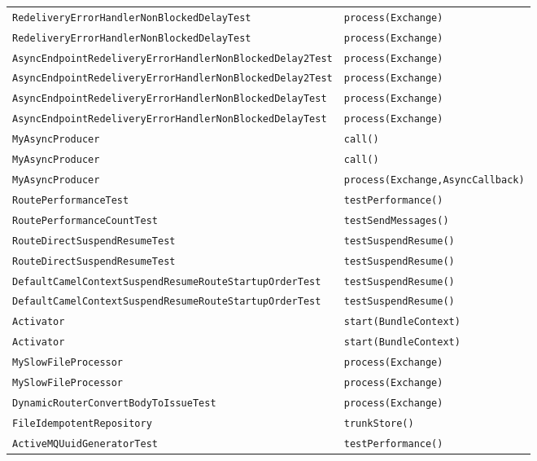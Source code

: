 \begin{center}
\begin{longtable}{ll}
\lstinline/RedeliveryErrorHandlerNonBlockedDelayTest/&{\lstinline/process(Exchange)/}\\
\lstinline/RedeliveryErrorHandlerNonBlockedDelayTest/&{\lstinline/process(Exchange)/}\\
\lstinline/AsyncEndpointRedeliveryErrorHandlerNonBlockedDelay2Test/&{\lstinline/process(Exchange)/}\\
\lstinline/AsyncEndpointRedeliveryErrorHandlerNonBlockedDelay2Test/&{\lstinline/process(Exchange)/}\\
\lstinline/AsyncEndpointRedeliveryErrorHandlerNonBlockedDelayTest/&{\lstinline/process(Exchange)/}\\
\lstinline/AsyncEndpointRedeliveryErrorHandlerNonBlockedDelayTest/&{\lstinline/process(Exchange)/}\\
\lstinline/MyAsyncProducer/&{\lstinline/call()/}\\
\lstinline/MyAsyncProducer/&{\lstinline/call()/}\\
\lstinline/MyAsyncProducer/&{\lstinline/process(Exchange,AsyncCallback)/}\\
\lstinline/RoutePerformanceTest/&{\lstinline/testPerformance()/}\\
\lstinline/RoutePerformanceCountTest/&{\lstinline/testSendMessages()/}\\
\lstinline/RouteDirectSuspendResumeTest/&{\lstinline/testSuspendResume()/}\\
\lstinline/RouteDirectSuspendResumeTest/&{\lstinline/testSuspendResume()/}\\
\lstinline/DefaultCamelContextSuspendResumeRouteStartupOrderTest/&{\lstinline/testSuspendResume()/}\\
\lstinline/DefaultCamelContextSuspendResumeRouteStartupOrderTest/&{\lstinline/testSuspendResume()/}\\
\lstinline/Activator/&{\lstinline/start(BundleContext)/}\\
\lstinline/Activator/&{\lstinline/start(BundleContext)/}\\
\lstinline/MySlowFileProcessor/&{\lstinline/process(Exchange)/}\\
\lstinline/MySlowFileProcessor/&{\lstinline/process(Exchange)/}\\
\lstinline/DynamicRouterConvertBodyToIssueTest/&{\lstinline/process(Exchange)/}\\
\lstinline/FileIdempotentRepository/&{\lstinline/trunkStore()/}\\
\lstinline/ActiveMQUuidGeneratorTest/&{\lstinline/testPerformance()/}\\

\end{longtable}
\end{center}
